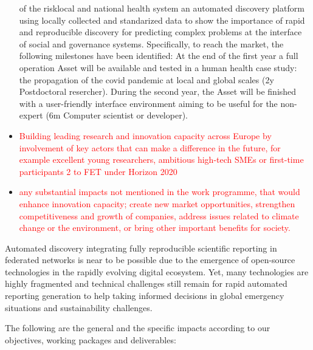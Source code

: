 \documentclass[12pt, a4paper]{article} %
\begin{document}
\begin{itemize}
{    of the risklocal and national health system an automated
    discovery platform using locally collected and standarized data to
    show the importance of rapid and reproducible discovery for
    predicting complex problems at the interface of social and
    governance systems. Specifically, to reach the market, the
    following milestones have been identified: At the end of the first
    year a full operation Asset will be available and tested in a
    human health case study: the propagation of the covid pandemic at
    local and global scales (2y Postdoctoral resercher). During the
    second year, the Asset will be finished with a user-friendly
    interface environment aiming to be useful for the non-expert (6m
    Computer scientist or developer).  }
\item \textcolor{red}{Building leading research and innovation
    capacity across Europe by involvement of key actors that can make
    a difference in the future, for example excellent young
    researchers, ambitious high-tech SMEs or first-time participants 2
    to FET under Horizon 2020}
\item \textcolor{red}{any substantial impacts not mentioned in the
    work programme, that would enhance innovation capacity; create new
    market opportunities, strengthen competitiveness and growth of
    companies, address issues related to climate change or the
    environment, or bring other important benefits for society.}
\end{itemize}

Automated discovery integrating fully reproducible scientific
reporting in federated networks is near to be possible due to the
emergence of open-source technologies in the rapidly evolving digital
ecosystem. Yet, many technologies are highly fragmented and technical
challenges still remain for rapid automated reporting generation to
help taking informed decisions in global emergency situations and
sustainability challenges. 



  
The following are the general and the specific impacts according to
our objectives, working packages and deliverables:
\end{document}
